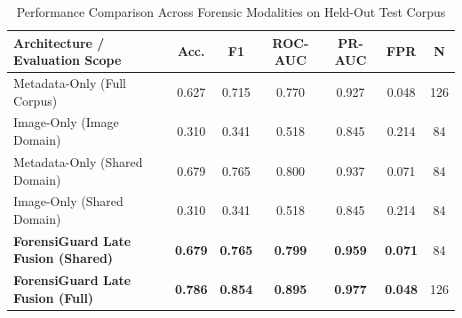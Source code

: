 \begin{table}[htbp]
\centering
\caption{Performance Comparison Across Forensic Modalities on Held-Out Test Corpus}
\label{tab:modality_comparison}
\begin{tabular}{|l|c|c|c|c|c|c|}
\hline
\textbf{Architecture / Evaluation Scope} & \textbf{Acc.} & \textbf{F1} & \textbf{ROC-AUC} & \textbf{PR-AUC} & \textbf{FPR} & \textbf{N} \\ \hline
Metadata-Only (Full Corpus) & 0.627 & 0.715 & 0.770 & 0.927 & 0.048 & 126 \\ \hline
Image-Only (Image Domain) & 0.310 & 0.341 & 0.518 & 0.845 & 0.214 & 84 \\ \hline
Metadata-Only (Shared Domain) & 0.679 & 0.765 & 0.800 & 0.937 & 0.071 & 84 \\ \hline
Image-Only (Shared Domain) & 0.310 & 0.341 & 0.518 & 0.845 & 0.214 & 84 \\ \hline
\textbf{ForensiGuard Late Fusion (Shared)} & \textbf{0.679} & \textbf{0.765} & \textbf{0.799} & \textbf{0.959} & \textbf{0.071} & 84 \\ \hline
\textbf{ForensiGuard Late Fusion (Full)} & \textbf{0.786} & \textbf{0.854} & \textbf{0.895} & \textbf{0.977} & \textbf{0.048} & 126 \\ \hline
\end{tabular}
\end{table}

